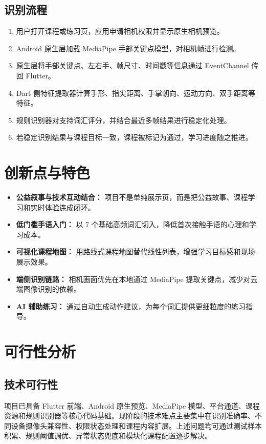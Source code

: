 \documentclass[UTF8,a4paper,12pt]{ctexart}
\begin{document}
\subsection{识别流程}

\begin{enumerate}
  \item 用户打开课程或练习页，应用申请相机权限并显示原生相机预览。
  \item Android 原生层加载 MediaPipe 手部关键点模型，对相机帧进行检测。
  \item 原生层将手部关键点、左右手、帧尺寸、时间戳等信息通过 EventChannel 传回 Flutter。
  \item Dart 侧特征提取器计算手形、指尖距离、手掌朝向、运动方向、双手距离等特征。
  \item 规则识别器对支持词汇评分，并结合最近多帧结果进行稳定化处理。
  \item 若稳定识别结果与课程目标一致，课程被标记为通过，学习进度随之推进。
\end{enumerate}

\section{创新点与特色}

\begin{itemize}
  \item \textbf{公益叙事与技术互动结合：} 项目不是单纯展示页，而是把公益故事、课程学习和实时体验连成闭环。
  \item \textbf{低门槛手语入门：} 以 7 个基础高频词汇切入，降低首次接触手语的心理和学习成本。
  \item \textbf{可视化课程地图：} 用路线式课程地图替代线性列表，增强学习目标感和现场展示效果。
  \item \textbf{端侧识别链路：} 相机画面优先在本地通过 MediaPipe 提取关键点，减少对云端图像识别的依赖。
  \item \textbf{AI 辅助练习：} 通过自动生成动作建议，为每个词汇提供更细粒度的练习指导。
\end{itemize}

\section{可行性分析}

\subsection{技术可行性}

项目已具备 Flutter 前端、Android 原生预览、MediaPipe 模型、平台通道、课程资源和规则识别器等核心代码基础。现阶段的技术难点主要集中在识别准确率、不同设备摄像头兼容性、权限状态处理和课程内容扩展。上述问题均可通过测试样本积累、规则阈值调优、异常状态兜底和模块化课程配置逐步解决。
\end{document}
